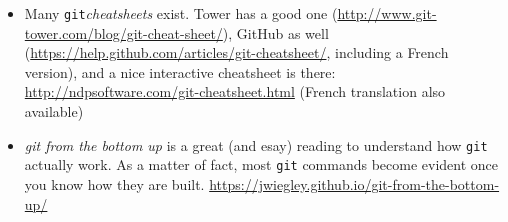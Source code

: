 \documentclass{instructions}
\newcommand{\git}{\texttt{git}\xspace}
\begin{document}
\begin{itemize}
    \item Many \git \emph{cheatsheets} exist. Tower has a good one
        (\url{http://www.git-tower.com/blog/git-cheat-sheet/}), GitHub as well
        (\url{https://help.github.com/articles/git-cheatsheet/}, including a
        French version), and a nice
        interactive cheatsheet is there:
        \url{http://ndpsoftware.com/git-cheatsheet.html} (French translation
        also available)
    \item \emph{git from the bottom up} is a great (and esay) reading to understand how
        \git actually work. As a matter of fact, most \git commands become evident once you know how they are
        built. \url{https://jwiegley.github.io/git-from-the-bottom-up/}
\end{itemize}
\end{document}
